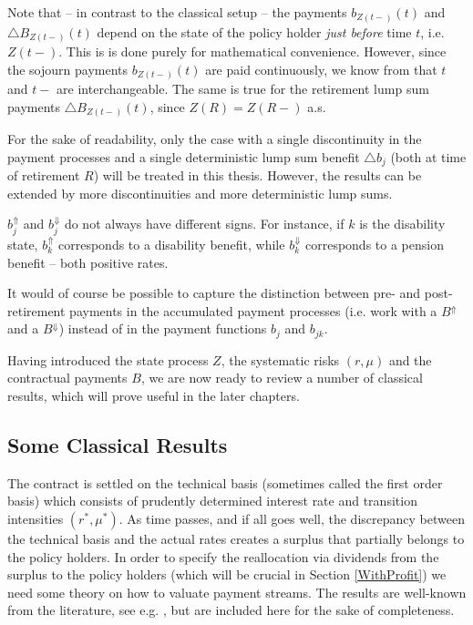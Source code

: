\documentclass{article}
\newcommand{\1}[1]{\mathbbm{1}_{\left\lbrace #1 \right\rbrace}}
\theoremstyle{break}
\theoremstyle{remark}
\newenvironment{remark}
  {\pushQED{\qed}\renewcommand{\qedsymbol}{\scalebox{1.4}{$\circ$}}\remarkx}
  {\popQED\endremarkx}
\numberwithin{equation}{section}
\begin{document}
Note that -- in contrast to the classical setup -- the payments $b_{Z(t-)}(t)$ and $\triangle B_{Z(t-)}(t)$ depend on the state of the policy holder \textit{just before} time $t$, i.e. $Z(t-)$. This is is done purely for mathematical convenience. However, since the sojourn payments $b_{Z(t-)}(t)$ are paid continuously, we know from \cite{LivStok} that $t$ and $t-$ are interchangeable. The same is true for the retirement lump sum payments $\triangle B_{Z(t-)}(t)$, since $Z(R) = Z(R-)$ a.s.

\begin{remark}
	For the sake of readability, only the case with a single discontinuity in the payment processes and a single deterministic lump sum benefit $\triangle b_j$ (both at time of retirement $R$) will be treated in this thesis. However, the results can be extended by more discontinuities and more deterministic lump sums.
\end{remark}

\begin{remark}
	$b_j^{\Uparrow}$ and $b_j^{\Downarrow}$ do not always have different signs. For instance, if $k$ is the disability state, $b_k^{\Uparrow}$ corresponds to a disability benefit, while $b_k^{\Downarrow}$ corresponds to a pension benefit -- both positive rates.
\end{remark}

\begin{remark}
	It would of course be possible to capture the distinction between pre- and post-retirement payments in the accumulated payment processes (i.e. work with a $B^{\Uparrow}$ and a $B^{\Downarrow}$) instead of in the payment functions $b_j$ and $b_{jk}$.
\end{remark}

Having introduced the state process $Z$, the systematic risks $(r,\mu)$ and the contractual payments $B$, we are now ready to review a number of classical results, which will prove useful in the later chapters.

\subsection{Some Classical Results}

The contract is settled on the technical basis (sometimes called the first order basis) which consists of prudently determined interest rate and transition intensities $(r^*,\mu^*)$. As time passes, and if all goes well, the discrepancy between the technical basis and the actual rates creates a surplus that partially belongs to the policy holders. In order to specify the reallocation via dividends from the surplus to the policy holders (which will be crucial in Section \ref{WithProfit}) we need some theory on how to valuate payment streams. The results are well-known from the literature, see e.g. \cite{Norberg1991}, but are included here for the sake of completeness.
\end{document}
